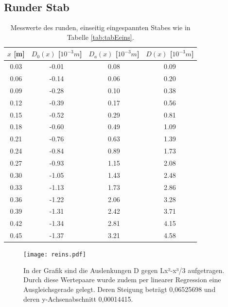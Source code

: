 \documentclass[titlepage = firstcover]{scrartcl}
\begin{document}
      \subsection{Runder Stab}
      \begin{table}[h]
        \centering
        \caption{Messwerte des runden, einseitig eingespannten Stabes wie in Tabelle \ref{tab:tabEeins}.}
        \label{tab:tabReins}
        \begin{tabular}{c c c c}
          \toprule
          {$x$ [m]} & {$D_0(x)$ [$10^{-3}m$]} & {$D_a(x)$ [$10^{-3}m$]} & {$D(x)$ [$10^{-3}m$]}\\
          \midrule
          0.03 &-0.01 & 0.08 & 0.09\\
          0.06 &-0.14 & 0.06 & 0.20\\
          0.09 &-0.28 & 0.10 & 0.38\\
          0.12 &-0.39 & 0.17 & 0.56\\
          0.15 &-0.52 & 0.29 & 0.81\\
          0.18 &-0.60 & 0.49 & 1.09\\
          0.21 &-0.76 & 0.63 & 1.39\\
          0.24 &-0.84 & 0.89 & 1.73\\
          0.27 &-0.93 & 1.15 & 2.08\\
          0.30 &-1.05 & 1.43 & 2.48\\
          0.33 &-1.13 & 1.73 & 2.86\\
          0.36 &-1.22 & 2.06 & 3.28\\
          0.39 &-1.31 & 2.42 & 3.71\\
          0.42 &-1.34 & 2.81 & 4.15\\
          0.45 &-1.37 & 3.21 & 4.58\\
          \bottomrule            
        \end{tabular}
      \end{table}
    
      \begin{figure}
        \centering
        \texttt{[image: reins.pdf]}
        \caption{In der Grafik sind die Auslenkungen D gegen Lx²-x³/3 aufgetragen. Durch diese Wertepaare wurde zudem per linearer Regression eine Ausgleichsgerade gelegt. Deren Steigung beträgt 0,06525698 und deren y-Achsenabschnitt 0,00014415.}
        \label{fig:graphReins}
      \end{figure}
\end{document}
